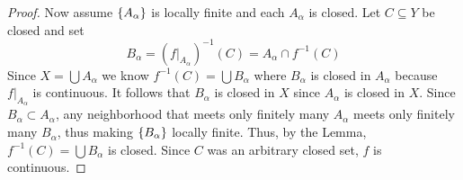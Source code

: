 \documentclass{exam}
\begin{document}
\begin{solution}
\begin{parts}
\begin{proof}
            Now assume $\left\{A_\alpha \right\}$ is locally finite and each $A_\alpha$ is closed. Let $C \subseteq Y$ be closed and set 
            \[
                B_\alpha = (f|_{A_{\alpha}})^{-1}(C) = A_{\alpha} \cap f^{-1}(C)
            \]
            Since $X = \bigcup A_{\alpha}$ we know $f^{-1}(C) = \bigcup B_\alpha$ where $B_\alpha$ is closed in $A_\alpha$ because $f|_{A_{\alpha}}$ is continuous. It follows that $B_\alpha$ is closed in $X$ since $A_\alpha$ is closed in $X$. Since $B_\alpha \subset A_\alpha$, any neighborhood that meets only finitely many $A_\alpha$ meets only finitely many $B_\alpha$, thus making $\left\{B_\alpha \right\}$ locally finite. Thus, by the Lemma, $f^{-1}(C) = \bigcup B_\alpha$ is closed. Since $C$ was an arbitrary closed set, $f$ is continuous.
        \end{proof}
    \end{parts}
\end{solution}

\newpage 
\end{document}
